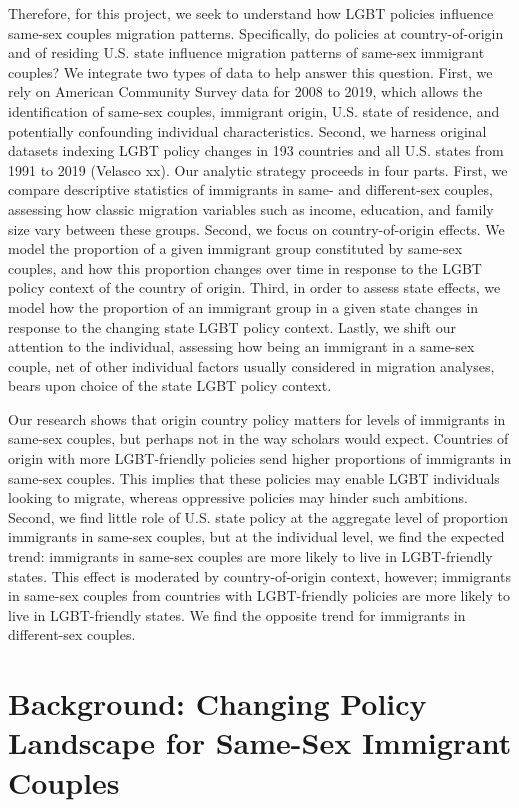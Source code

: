 \documentclass[
  11pt,
]{article}
\begin{document}
Therefore, for this project, we seek to understand how LGBT policies influence same-sex couples migration patterns. Specifically, do policies at country-of-origin and of residing U.S. state influence migration patterns of same-sex immigrant couples? We integrate two types of data to help answer this question. First, we rely on American Community Survey data for 2008 to 2019, which allows the identification of same-sex couples, immigrant origin, U.S. state of residence, and potentially confounding individual characteristics. Second, we harness original datasets indexing LGBT policy changes in 193 countries and all U.S. states from 1991 to 2019 (Velasco xx). Our analytic strategy proceeds in four parts. First, we compare descriptive statistics of immigrants in same- and different-sex couples, assessing how classic migration variables such as income, education, and family size vary between these groups. Second, we focus on country-of-origin effects. We model the proportion of a given immigrant group constituted by same-sex couples, and how this proportion changes over time in response to the LGBT policy context of the country of origin. Third, in order to assess state effects, we model how the proportion of an immigrant group in a given state changes in response to the changing state LGBT policy context. Lastly, we shift our attention to the individual, assessing how being an immigrant in a same-sex couple, net of other individual factors usually considered in migration analyses, bears upon choice of the state LGBT policy context.

Our research shows that origin country policy matters for levels of immigrants in same-sex couples, but perhaps not in the way scholars would expect. Countries of origin with more LGBT-friendly policies send higher proportions of immigrants in same-sex couples. This implies that these policies may enable LGBT individuals looking to migrate, whereas oppressive policies may hinder such ambitions. Second, we find little role of U.S. state policy at the aggregate level of proportion immigrants in same-sex couples, but at the individual level, we find the expected trend: immigrants in same-sex couples are more likely to live in LGBT-friendly states. This effect is moderated by country-of-origin context, however; immigrants in same-sex couples from countries with LGBT-friendly policies are more likely to live in LGBT-friendly states. We find the opposite trend for immigrants in different-sex couples.

\hypertarget{background-changing-policy-landscape-for-same-sex-immigrant-couples}{%
\section{Background: Changing Policy Landscape for Same-Sex Immigrant Couples}\label{background-changing-policy-landscape-for-same-sex-immigrant-couples}}
\end{document}
